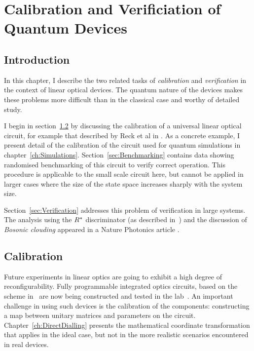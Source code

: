 \chapter{Calibration and Verificiation of Quantum Devices}
\label{ch:QCV}

\section{Introduction}
\label{sec:QCVIntro}
In this chapter, I describe the two related tasks of \emph{calibration} and
\emph{verification} in the context of linear optical devices. The
quantum nature of the devices makes these problems more difficult than in the
classical case and worthy of detailed study.

I begin in section~\ref{sec:Calibration} by discussing the calibration of a
universal linear optical circuit, for example that described by Reck et al in
\cite{reck}. As a concrete example, I present detail of the calibration of the
circuit used for quantum simulations in chapter~\ref{ch:Simulations}.
Section~\ref{sec:Benchmarking} contains data showing randomised benchmarking of
this circuit to verify correct operation. This procedure is applicable to the
small scale circuit here, but cannot be applied in larger cases where the size
of the state space increases sharply with the system size.

Section~\ref{sec:Verification} addresses this problem of verification in large
systems. The analysis using the \(R^{*}\) discriminator (as described
in~\cite{notuniform}) and the discussion of \emph{Bosonic clouding} appeared in
a Nature Photonics article \cite{verification}.

\section{Calibration}
\label{sec:Calibration}
Future experiments in linear optics are going to exhibit a high degree of
reconfigurability. Fully programmable integrated optics circuits, based on the
scheme in~\cite{reck} are now being constructed and tested in the
lab~\cite{bigreck, qpp}. An important challenge in using such devices is the
calibration of the components: constructing a map between unitary matrices and
parameters on the circuit. Chapter~\ref{ch:DirectDialling} presents the
mathematical coordinate transformation that applies in the ideal case, but not
in the more realistic scenarios encountered in real devices.

